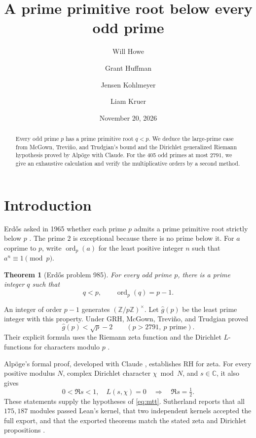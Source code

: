 \documentclass[11pt,letterpaper]{amsart}
\title[A prime primitive root below every odd prime]{A prime primitive root below every odd prime}
\author[W. Howe]{Will Howe}
\author[G. Huffman]{Grant Huffman}
\author[J. Kohlmeyer]{Jensen Kohlmeyer}
\author[L. Kruer]{Liam Kruer}
\date{November 20, 2026}
\newtheorem{theorem}{Theorem}[section]
\newcommand{\ord}{\operatorname{ord}}
\newcommand{\gr}{\widehat g}
\begin{document}
\begin{abstract}
Every odd prime \(p\) has a prime primitive root \(q<p\). We deduce the
large-prime case from McGown, Trevi\~no, and Trudgian's bound and the
Dirichlet generalized Riemann hypothesis proved by Alp\"oge with Claude.
For the 405 odd primes at most \(2791\), we give an exhaustive calculation
and verify the multiplicative orders by a second method.
\end{abstract}
\maketitle
\section{Introduction}
Erd\H{o}s asked in 1965 whether each prime \(p\) admits a prime primitive
root strictly below \(p\) \cite[p.~233]{erdos}. The prime \(2\) is exceptional
because there is no prime below it. For \(a\) coprime to \(p\), write \(\ord_p(a)\) for
the least positive integer \(n\) such that \(a^n\equiv1\pmod p\).

\begin{theorem}[Erd\H{o}s problem 985]\label{t:main}
For every odd prime \(p\), there is a prime integer \(q\) such that
\[
                         q<p,\qquad \ord_p(q)=p-1 .
\]
\end{theorem}
An integer of order \(p-1\) generates \((\mathbb Z/p\mathbb Z)^\times\).
Let \(\gr(p)\) be the least prime integer with this property. Under GRH,
McGown, Trevi\~no, and Trudgian \cite[Theorem~1]{mtt} proved
\begin{equation}\label{eq:mtt}
                         \gr(p)<\sqrt{p}-2\qquad(p>2791,\ p\text{ prime}).
\end{equation}
Their explicit formula uses the Riemann zeta function and the Dirichlet
\(L\)-functions for characters modulo \(p\) \cite[\S2, Lemma~1]{mtt}.

Alp\"oge's formal proof, developed with Claude \cite{alp}, establishes RH
for zeta. For every positive modulus \(N\), complex Dirichlet character
\(\chi\bmod N\), and \(s\in\mathbb C\), it also gives
\[
            0<\Re s<1,\quad L(s,\chi)=0
            \quad\Longrightarrow\quad \Re s=\tfrac12 .
\]
These statements supply the hypotheses of \eqref{eq:mtt}. Sutherland reports
that all \(175{,}187\) modules passed Lean's kernel, that two independent kernels
accepted the full export, and that the exported theorems match the stated
zeta and Dirichlet propositions \cite{mit}.
\end{document}
